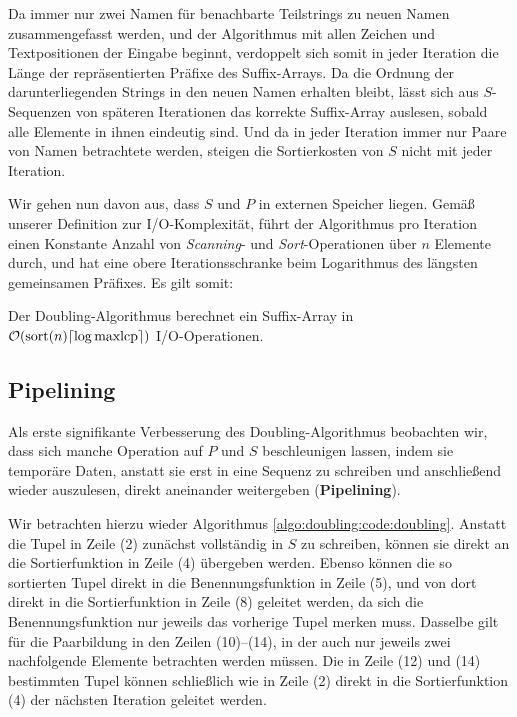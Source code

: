 Da immer nur zwei Namen für benachbarte Teilstrings zu neuen Namen zusammengefasst werden, und der Algorithmus mit allen Zeichen und Textpositionen der Eingabe beginnt, verdoppelt sich somit in jeder Iteration die Länge der repräsentierten Präfixe des Suffix-Arrays. Da die Ordnung der darunterliegenden Strings in den neuen Namen erhalten bleibt, lässt sich aus $S$-Sequenzen von späteren Iterationen das korrekte Suffix-Array auslesen, sobald alle Elemente in ihnen eindeutig sind. Und da in jeder Iteration immer nur Paare von Namen betrachtete werden, steigen die Sortierkosten von $S$ nicht mit jeder Iteration.

Wir gehen nun davon aus, dass $S$ und $P$ in externen Speicher liegen. Gemäß unserer Definition zur I/O-Komplexität, führt der Algorithmus pro Iteration einen Konstante Anzahl von \textit{Scanning}- und \textit{Sort}-Operationen über $n$ Elemente durch, und hat eine obere Iterationsschranke beim Logarithmus des längsten gemeinsamen Präfixes. Es gilt somit:

\begin{theorem}
Der Doubling-Algorithmus berechnet ein Suffix-Array in\\ $\mathcal{O}(\text{sort}(n) \ceil*{\log \text{maxlcp}})$ I/O-Operationen.
\end{theorem}

\subsection{Pipelining}
\label{algo:doubling:sec:pipelining}

Als erste signifikante Verbesserung des Doubling-Algorithmus beobachten wir, dass sich manche Operation auf $P$ und $S$ beschleunigen lassen, indem sie temporäre Daten, anstatt sie erst in eine Sequenz zu schreiben und anschließend wieder auszulesen, direkt aneinander weitergeben (\textbf{Pipelining}). 

Wir betrachten hierzu wieder Algorithmus \ref{algo:doubling:code:doubling}. Anstatt die Tupel in Zeile (2) zunächst vollständig in $S$ zu schreiben, können sie direkt an die Sortierfunktion in Zeile (4) übergeben werden. Ebenso können die so sortierten Tupel direkt in die Benennungsfunktion in Zeile (5), und von dort direkt in die Sortierfunktion in Zeile (8) geleitet werden, da sich die Benennungsfunktion nur jeweils das vorherige Tupel merken muss. Dasselbe gilt für die Paarbildung in den Zeilen (10)--(14), in der auch nur jeweils zwei nachfolgende Elemente betrachten werden müssen. Die in Zeile (12) und (14) bestimmten Tupel können schließlich wie in Zeile (2) direkt in die Sortierfunktion (4) der nächsten Iteration geleitet werden.

